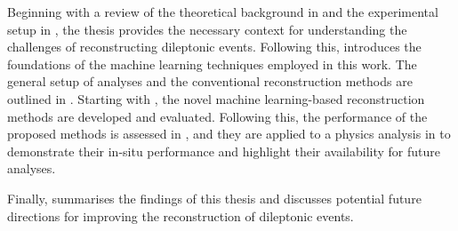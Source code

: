 Beginning with a review of the theoretical background in  and the experimental setup in , the thesis provides the necessary context for understanding the challenges of reconstructing dileptonic \ttbar events. Following this,  introduces the foundations of the machine learning techniques employed in this work. The general setup of \ttbar analyses and the conventional reconstruction methods are outlined in . Starting with , the novel machine learning-based reconstruction methods are developed and evaluated. Following this, the performance of the proposed methods is assessed in , and they are applied to a physics analysis in  to demonstrate their in-situ performance and highlight their availability for future analyses.

Finally,  summarises the findings of this thesis and discusses potential future directions for improving the reconstruction of dileptonic \ttbar events.

